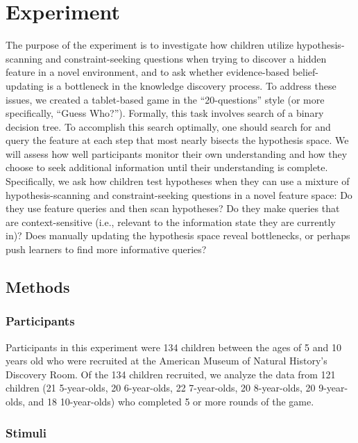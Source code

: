 \documentclass[man,floatsintext]{apa6}
\begin{document}
\section{Experiment}
The purpose of the experiment is to investigate how children utilize hypothesis-
scanning and constraint-seeking questions when trying to discover a hidden feature 
in a novel environment, and to ask whether evidence-based belief-updating is a 
bottleneck in the knowledge discovery process. To address these issues, we created 
a tablet-based game in the ``20-questions'' style (or more specifically, ``Guess 
Who?''). Formally, this task involves search of a binary decision tree. To accomplish 
this search optimally, one should search for and query the feature at each step that 
most nearly bisects the hypothesis space. 
We will assess how well  participants monitor their own understanding and how they choose to seek additional 
information until their understanding is complete. Specifically, we ask how children 
test hypotheses when they can use a mixture of hypothesis-scanning and constraint-seeking 
questions in a novel feature space: Do they use feature queries and then scan hypotheses? 
Do they make queries that are context-sensitive (i.e., relevant to the information state 
they are currently in)? Does manually updating the hypothesis space reveal 
bottlenecks, or perhaps push learners to find more informative queries?

\subsection{Methods}
\subsubsection{Participants}

Participants in this experiment were 134 children between the ages of 5 and 10 
years old who were recruited at the American Museum of Natural History's 
Discovery Room. Of the 134 children recruited, we analyze the data from 121 
children (21 5-year-olds, 20 6-year-olds, 22 7-year-olds, 20 8-year-olds, 20 9-year-olds, 
and 18 10-year-olds) who completed 5 or more rounds of the game.

\subsubsection{Stimuli}
\end{document}
